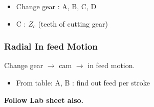 \documentclass{article}
\begin{document}
\begin{multicols}{2}
  \begin{itemize}
    \item Change gear : A, B, C, D 
    \item C : $Z_c$ (teeth of cutting gear) 
  \end{itemize}
  
  \subsubsection{Radial In feed Motion}
  Change gear $\rightarrow$ cam $\rightarrow$ in feed motion. 

  \begin{itemize}
    \item From table: A, B : find out feed per stroke 
  \end{itemize}

  \textbf{Follow Lab sheet also.}\\
\end{multicols}
\end{document}
